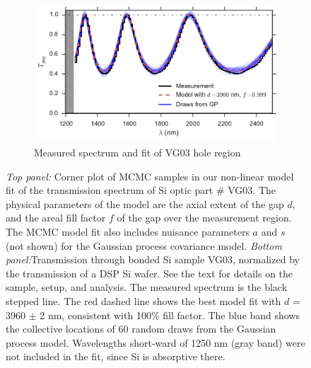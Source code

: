 \begin{figure}[htbp]
        \begin{subfigure}[b]{0.5\textwidth}
                \includegraphics[width=\textwidth]{chSiGaps/figs/VG03_f100.pdf}
                \caption{Measured spectrum and fit of VG03 hole region}
                \label{figVG03_f100}
        \end{subfigure}
\caption{ \emph{Top panel:} Corner plot of MCMC samples in our non-linear model fit of the transmission spectrum of Si optic part \# VG03.  The physical parameters of the model are the axial extent of the gap $d$, and the areal fill factor $f$ of the gap over the measurement region.  The MCMC model fit also includes nuisance parameters $a$ and $s$ (not shown) for the Gaussian process covariance model.  \emph{Bottom panel:}Transmission through bonded Si sample VG03, normalized by the transmission of a DSP Si wafer. See the text for details on the sample, setup, and analysis.  The measured spectrum is the black stepped line.  The red dashed line shows the best model fit with $d$ = 3960 $\pm$ 2 nm, consistent with 100\% fill factor.  The blue band shows the collective locations of 60 random draws from the Gaussian process model.  Wavelengths short-ward of 1250 nm (gray band) were not included in the fit, since Si is absorptive there.\label{figVG03full} }
\end{figure}


